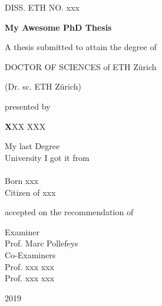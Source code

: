 \thispagestyle{empty}

\newcommand{\thenumber}{xxx}
\newcommand{\thetitle}{My Awesome PhD Thesis}
\newcommand{\theauthor}{XXX XXX}
\newcommand{\theauthorProfile}{My last Degree \\University I got it from\\ \ \\Born xxx \\ Citizen of xxx}
\newcommand{\therecommendation}{Examiner\\ Prof. Marc Pollefeys \\ \vspace{0.3cm} Co-Examiners \\Prof. xxx xxx\\Prof. xxx xxx}
\newcommand{\thedate}{2019}

\begin{titlepage}

 \centering
 \begin{center}
 DISS. ETH NO. \thenumber
 \end{center}
 \vspace{0.3cm}
 \begin{Large}\bfseries
  \thetitle\par
 \end{Large}
 \vspace{0.5cm}
 \begin{center}
 A thesis submitted to attain the degree of
 \end{center}
 DOCTOR OF SCIENCES of ETH Z\"{u}rich \par
 \begin{center}
 (Dr. sc. ETH Z\"{u}rich)
 \end{center}
 \par
 \vspace{0.5cm}
 presented by
 \par
 \vspace{0.8cm}
  \textbf
 \theauthor\par
  \vspace{0.5cm}
 \theauthorProfile\par
 \vspace{0.6cm}
 accepted on the recommendation of
  \vspace{0.2cm}
 \par
 \therecommendation
 \par
 \vspace{0.9cm}
 \thedate
 \par
\end{titlepage}